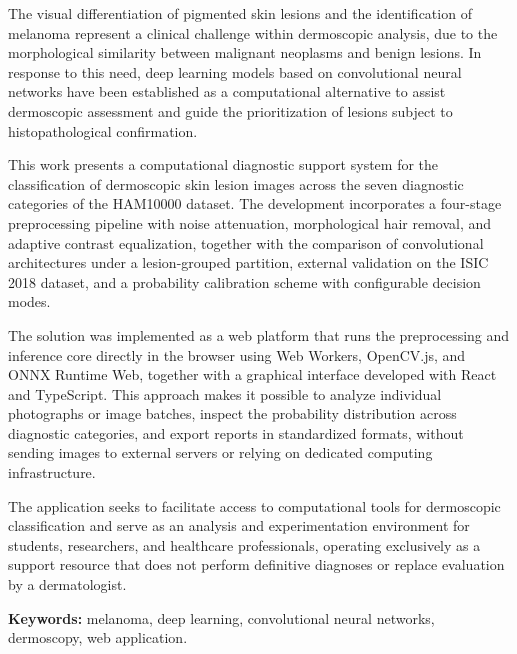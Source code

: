 The visual differentiation of pigmented skin lesions and the identification of melanoma represent a clinical challenge within dermoscopic analysis, due to the morphological similarity between malignant neoplasms and benign lesions. In response to this need, deep learning models based on convolutional neural networks have been established as a computational alternative to assist dermoscopic assessment and guide the prioritization of lesions subject to histopathological confirmation.

This work presents a computational diagnostic support system for the classification of dermoscopic skin lesion images across the seven diagnostic categories of the HAM10000 dataset. The development incorporates a four-stage preprocessing pipeline with noise attenuation, morphological hair removal, and adaptive contrast equalization, together with the comparison of convolutional architectures under a lesion-grouped partition, external validation on the ISIC 2018 dataset, and a probability calibration scheme with configurable decision modes.

The solution was implemented as a web platform that runs the preprocessing and inference core directly in the browser using Web Workers, OpenCV.js, and ONNX Runtime Web, together with a graphical interface developed with React and TypeScript. This approach makes it possible to analyze individual photographs or image batches, inspect the probability distribution across diagnostic categories, and export reports in standardized formats, without sending images to external servers or relying on dedicated computing infrastructure.

The application seeks to facilitate access to computational tools for dermoscopic classification and serve as an analysis and experimentation environment for students, researchers, and healthcare professionals, operating exclusively as a support resource that does not perform definitive diagnoses or replace evaluation by a dermatologist.

\vspace{1em}
\noindent\textbf{Keywords:} melanoma, deep learning, convolutional neural networks, dermoscopy, web application.
